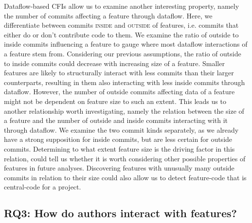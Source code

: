 Dataflow-based CFIs allow us to examine another interesting property, namely the number of commits affecting a feature through dataflow.
Here, we differentiate between commits \textsc{inside} and \textsc{outside} of features, i.e. commits that either do or don't contribute code to them.
We examine the ratio of outside to inside commits influencing a feature to gauge where most dataflow interactions of a feature stem from.
Considering our previous assumptions, the ratio of outside to inside commits could decrease with increasing size of a feature.
Smaller features are likely to structurally interact with less commits than their larger counterparts, resulting in them also interacting with less inside commits through dataflow.
However, the number of outside commits affecting data of a feature might not be dependent on feature size to such an extent.
This leads us to another relationship worth investigating, namely the relation between the size of a feature and the number of outside and inside commits interacting with it through dataflow.
We examine the two commit kinds separately, as we already have a strong supposition for inside commits, but are less certain for outside commits. 
Determining to what extent feature size is the driving factor in this relation, could tell us whether it is worth considering other possible properties of features in future analyses.
Discovering features with unusually many outside commits in relation to their size could also allow us to detect feature-code that is central-code for a project.

\subsection*{\textbf{RQ3: How do authors interact with features?}}

